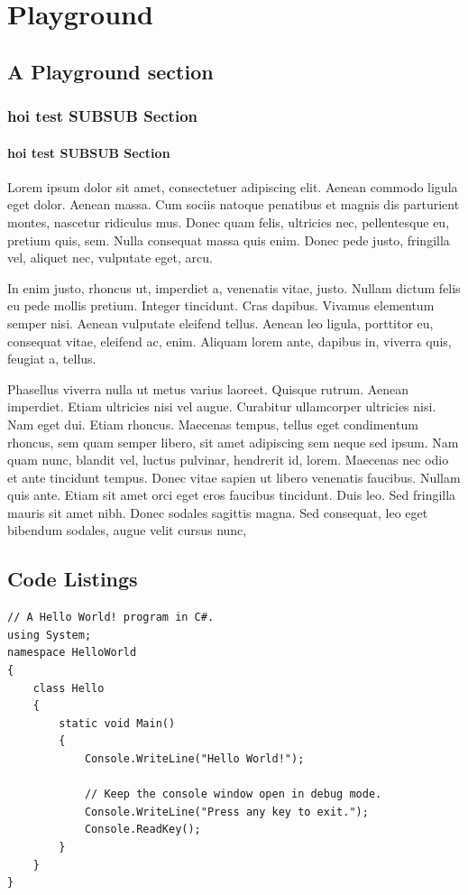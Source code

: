 \chapter{Playground}
\section{A Playground section}        

\subsection{hoi test SUBSUB Section}
\subsubsection{hoi test SUBSUB Section}
Lorem ipsum dolor sit amet, consectetuer adipiscing elit. Aenean commodo ligula eget dolor. Aenean massa. Cum sociis natoque penatibus et magnis dis parturient montes, nascetur ridiculus mus. Donec quam felis, ultricies nec, pellentesque eu, pretium quis, sem. Nulla consequat massa quis enim. Donec pede justo, fringilla vel, aliquet nec, vulputate eget, arcu.

In enim justo, rhoncus ut, imperdiet a, venenatis vitae, justo. Nullam dictum felis eu pede mollis pretium. Integer tincidunt. Cras dapibus. Vivamus elementum semper nisi. Aenean vulputate eleifend tellus. Aenean leo ligula, porttitor eu, consequat vitae, eleifend ac, enim. Aliquam lorem ante, dapibus in, viverra quis, feugiat a, tellus.

Phasellus viverra nulla ut metus varius laoreet. Quisque rutrum. Aenean imperdiet. Etiam ultricies nisi vel augue. Curabitur ullamcorper ultricies nisi. Nam eget dui. Etiam rhoncus. Maecenas tempus, tellus eget condimentum rhoncus, sem quam semper libero, sit amet adipiscing sem neque sed ipsum. Nam quam nunc, blandit vel, luctus pulvinar, hendrerit id, lorem. Maecenas nec odio et ante tincidunt tempus. Donec vitae sapien ut libero venenatis faucibus. Nullam quis ante. Etiam sit amet orci eget eros faucibus tincidunt. Duis leo. Sed fringilla mauris sit amet nibh. Donec sodales sagittis magna. Sed consequat, leo eget bibendum sodales, augue velit cursus nunc,

\section{Code Listings}
\begin{lstlisting}[language=CSharp, caption=Hello World in C\#, label=lst:helloWorldCSharp, firstnumber=1]
// A Hello World! program in C#.
using System;
namespace HelloWorld
{
    class Hello 
    {
        static void Main() 
        {
            Console.WriteLine("Hello World!");

            // Keep the console window open in debug mode.
            Console.WriteLine("Press any key to exit.");
            Console.ReadKey();
        }
    }
}
\end{lstlisting}

